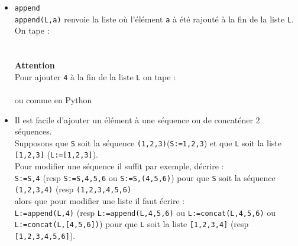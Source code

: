 \documentclass[12pt,a4paper]{book}
\begin{document}
\begin{giacjshere}
\begin{itemize}
\\
\\
 \\
\\
\\
\\
\\
 \\
\\
 \\
\\
\\
\item
{\tt append}\\
{\tt append(L,a)} renvoie la liste o\`u l'\'el\'ement {\tt a} \`a \'et\'e
rajout\'e \`a la fin de la liste {\tt L}.\\
On tape :\\
\\
\\
{\bf Attention}\\
Pour ajouter {\tt 4} \`a la fin de la liste {\tt L} on tape :\\
\\
ou comme en Python\\
\item
Il est facile d'ajouter un \'el\'ement \`a une s\'equence ou de concat\'ener 2 
s\'equences.\\
Supposons que  {\tt S} soit la s\'equence {\tt (1,2,3)}({\tt S:=1,2,3}) et 
que {\tt L} soit la liste {\tt [1,2,3]} ({\tt L:=[1,2,3]}).\\
Pour modifier une s\'equence il suffit par exemple, d\'ecrire :\\
{\tt S:=S,4} (resp {\tt S:=S,4,5,6} ou {\tt S:=S,(4,5,6)}) pour que
{\tt S} soit la s\'equence {\tt (1,2,3,4)} (resp {\tt (1,2,3,4,5,6)}\\
alors que pour modifier une liste il faut \'ecrire :\\
{\tt L:=append(L,4)} (resp {\tt L:=append(L,4,5,6)} ou {\tt L:=concat(L,4,5,6)} 
ou {\tt L:=concat(L,[4,5,6])}) pour que {\tt L} soit la liste {\tt [1,2,3,4]} 
(resp {\tt [1,2,3,4,5,6]}).\\

\end{itemize}
\end{giacjshere}
\end{document}
